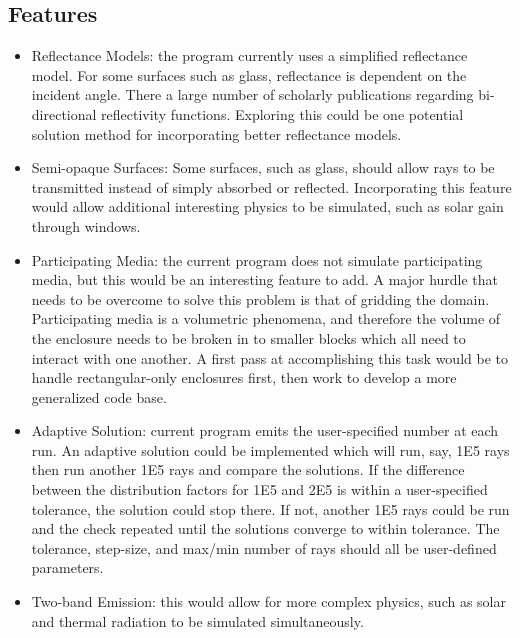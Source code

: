 \documentclass{article}
\begin{document}
\subsection{Features}

\begin{itemize}
	\item Reflectance Models: the program currently uses a simplified reflectance model. For some surfaces such as glass, reflectance is dependent on the incident angle. There a large number of scholarly publications regarding bi-directional reflectivity functions. Exploring this could be one potential solution method for incorporating better reflectance models.
	
	\item Semi-opaque Surfaces:	Some surfaces, such as glass, should allow rays to be transmitted instead of simply absorbed or reflected. Incorporating this feature would allow additional interesting physics to be simulated, such as solar gain through windows.

	\item Participating Media: the current program does not simulate participating media, but this would be an interesting feature to add. A major hurdle that needs to be overcome to solve this problem is that of gridding the domain. Participating media is a volumetric phenomena, and therefore the volume of the enclosure needs to be broken in to smaller blocks which all need to interact with one another. A first pass at accomplishing this task would be to handle rectangular-only enclosures first, then work to develop a more generalized code base.

	\item Adaptive Solution: current program emits the user-specified number at each run. An adaptive solution could be implemented which will run, say, \SI{1E5}{} rays then run another \SI{1E5}{} rays and compare the solutions. If the difference between the distribution factors for \SI{1E5}{} and \SI{2E5}{} is within a user-specified tolerance, the solution could stop there. If not, another \SI{1E5}{} rays could be run and the check repeated until the solutions converge to within tolerance. The tolerance, step-size, and max/min number of rays should all be user-defined parameters.

    \item Two-band Emission: this would allow for more complex physics, such as solar and thermal radiation to be simulated simultaneously.
	
\end{itemize}
\end{document}
